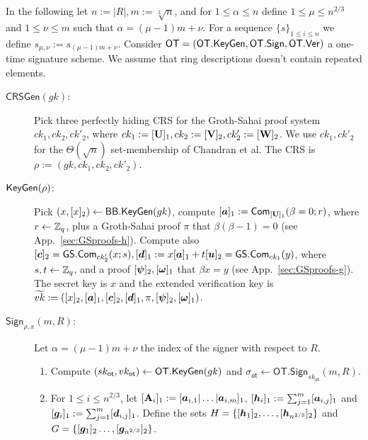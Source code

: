
In the following let $n:=|R|, m:=\sqrt[3]{n}$, and for $1\leq \alpha\leq n$ define $1\leq \mu \leq n^{2/3}$ and $1\leq \nu\leq m$ such that $\alpha=(\mu-1)m+\nu$. For a sequence $\{s\}_{1\leq i\leq n}$ we define $s_{\mu,\nu}:=s_{(\mu-1)m+\nu}$. Consider $\mathsf{OT}=(\mathsf{OT}.\mathsf{KeyGen},\mathsf{OT}.\mathsf{Sign},\allowbreak\mathsf{OT}.\mathsf{Ver})$ a one-time signature scheme. We assume that ring descriptions doesn't contain repeated elements.

\begin{description}
\item[$\mathsf{CRSGen}(gk)$:] Pick three perfectly hiding CRS for the Groth-Sahai proof system $ck_1,ck_2,ck'_2$, where $ck_1 := [\mathbf{{U}}]_1,ck_2 :=[\mathbf{{V}}]_2,ck'_2:=[\mathbf{{W}}]_2$. We use $ck_1,ck'_2$ for the $\Theta(\sqrt{n})$ set-membership of Chandran et al. The CRS is $\rho:=(gk,ck_1,ck_2,ck'_2).$

\item[$\mathsf{KeyGen}(\rho)$:] Pick $(x,[x]_2)\gets\mathsf{BB}.\mathsf{KeyGen}(gk)$, compute $[{\boldsymbol{a}}]_1:=\mathsf{Com}_{[\mathbf{{U}}]_1}(\beta = 0;r)$, where $r\gets\mathbb{Z}_q$, plus a Groth-Sahai proof $\pi$ that $\beta(\beta-1)=0$ (see App.~\ref{sec:GSproofs-h}). Compute also $[{\boldsymbol{c}}]_2 = {\mathsf{GS}}.\mathsf{Com}_{ck'_2}(x;s),[{\boldsymbol{d}}]_1 :=x[{\boldsymbol{a}}]_1+t[{\boldsymbol{u}}]_2 = {\mathsf{GS}}.\mathsf{Com}_{ck_1}(y)$, where $s,t\gets\mathbb{Z}_q$, and a proof $[{\boldsymbol{\psi}}]_2,[{\boldsymbol{\omega}}]_1$ that $\beta x = y$ (see App.~\ref{sec:GSproofs-g}). The secret key is $x$ and the extended verification key is $\widetilde{vk}:=([x]_2,[{\boldsymbol{a}}]_1,[{\boldsymbol{c}}]_2,\allowbreak[{\boldsymbol{d}}]_1,\pi,[{\boldsymbol{\psi}}]_2,[{\boldsymbol{\omega}}]_1)$.

\item[$\mathsf{Sign}_{\rho,x}(m,R)$:] Let $\alpha=(\mu-1)m+\nu$ the index of the signer with respect to $R$.
\begin{enumerate}
\item Compute $(sk_\mathsf{ot},vk_\mathsf{ot})\gets\mathsf{OT}.\mathsf{KeyGen}(gk)$ and $\sigma_\mathsf{ot}\gets\allowbreak\mathsf{OT}.\allowbreak\mathsf{Sign}_{sk_\mathsf{ot}}(m,R)$.

\item For $1\leq i \leq n^{2/3}$, let $[\mathbf{{A}}_i]_1:=[{\boldsymbol{a}}_{i,1}|\allowbreak\ldots|\allowbreak{\boldsymbol{a}}_{i,m}]_1$, $[{\boldsymbol{h}}_i]_1 := \sum_{j=1}^m[{\boldsymbol{a}}_{i,j}]_1$ and $[{\boldsymbol{g}}_i]_1:=\sum_{j=1}^{m}[{\boldsymbol{d}}_{i,j}]_1$. Define the sets
$H=\{[{\boldsymbol{h}}_1]_2,\ldots,[{\boldsymbol{h}}_{n^{2/3}}]_2\}$ and
$G=\{
	[{\boldsymbol{g}}_1]_2
	\allowbreak\ldots,\allowbreak
	[{\boldsymbol{g}}_{n^{2/3}}]_2\}$.


\end{enumerate}
\end{description}
